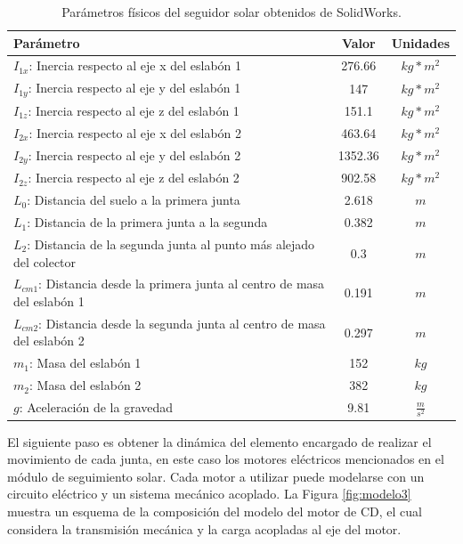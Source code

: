 \begin{table}[H]
  \centering
  \caption{Parámetros físicos del seguidor solar obtenidos de SolidWorks.}
    \begin{tabular}{|l|c|c|}
    \hline
    Parámetro & Valor & Unidades \\
    \hline
    $ I_{1x} $: Inercia respecto al eje x del eslabón 1 & 276.66 & $ kg*m^2 $ \\
    \hline
    $ I_{1y} $: Inercia respecto al eje y del eslabón 1 & 147 & $ kg*m^2 $ \\
    \hline
    $ I_{1z} $: Inercia respecto al eje z del eslabón 1 & 151.1 & $ kg*m^2 $ \\
    \hline
    $ I_{2x} $: Inercia respecto al eje x del eslabón 2 & 463.64 & $ kg*m^2 $ \\
    \hline
    $ I_{2y} $: Inercia respecto al eje y del eslabón 2 & 1352.36 & $ kg*m^2 $ \\
    \hline
    $ I_{2z} $: Inercia respecto al eje z del eslabón 2 & 902.58 & $ kg*m^2 $ \\
    \hline
    $ L_0 $: Distancia del suelo a la primera junta & 2.618 & $ m $ \\
    \hline
    $ L_1 $: Distancia de la primera junta a la segunda & 0.382 & $ m $ \\
    \hline
    $ L_2 $: Distancia de la segunda junta al punto más alejado del colector & 0.3 & $ m $ \\
    \hline
    $ L_{cm1} $: Distancia desde la primera junta al centro de masa del eslabón 1 & 0.191 & $ m $ \\
    \hline
    $ L_{cm2} $: Distancia desde la segunda junta al centro de masa del eslabón 2 & 0.297 & $ m $ \\
    \hline
    $ m_1 $: Masa del eslabón 1 & 152 & $ kg $ \\
    \hline
    $ m_2 $: Masa del eslabón 2 & 382 & $ kg $ \\
    \hline
    $ g $: Aceleración de la gravedad & 9.81 & $ \frac{m}{s^2} $ \\
    \hline
    \end{tabular}%
  \label{tab:modelo1}%
\end{table}%

El siguiente paso es obtener la dinámica del elemento encargado de realizar el movimiento de cada junta, en este caso los motores eléctricos mencionados en el módulo de seguimiento solar. Cada motor a utilizar puede modelarse con un circuito eléctrico y un sistema mecánico acoplado. La Figura \ref{fig:modelo3} muestra un esquema de la composición del modelo del motor de CD, el cual considera la transmisión mecánica y la carga acopladas al eje del motor.

